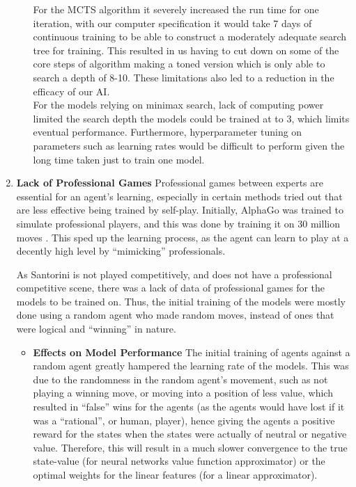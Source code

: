 \documentclass[a4paper,12pt,table]{article}
\begin{document}
\begin{enumerate}
\begin{itemize}
        For the MCTS algorithm it severely increased the run time for one iteration, with our computer specification it would take 7 days of continuous training to be able to construct a moderately adequate search tree for training. This resulted in us having to cut down on some of the core steps of algorithm making a toned version which is only able to search a depth of 8-10. These limitations also led to a reduction in the efficacy of our AI. \\

        For the models relying on minimax search, lack of computing power limited the search depth the models could be trained at to 3, which limits eventual performance. Furthermore, hyperparameter tuning on parameters such as learning rates would be difficult to perform given the long time taken just to train one model.

    \end{itemize}

    \item \textbf{Lack of Professional Games}
    \newline
    Professional games between experts are essential for an agent’s learning, especially in certain methods tried out that are less effective being trained by self-play. Initially, AlphaGo was trained to simulate professional players, and this was done by training it on 30 million moves \cite{Mastering the game of Go with deep neural networks and tree search}. This sped up the learning process, as the agent can learn to play at a decently high level by “mimicking” professionals.   \par

    As Santorini is not played competitively, and does not have a professional competitive scene, there was a lack of data of professional games for the models to be trained on. Thus, the initial training of the models were mostly done using a random agent who made random moves, instead of ones that were logical and “winning” in nature.
    
    \begin{itemize}
        \item \textbf{Effects on Model Performance}
        \newline
        The initial training of agents against a random agent greatly hampered the learning rate of the models. This was due to the randomness in the random agent’s movement, such as not playing a winning move, or moving into a position of less value, which resulted in “false” wins for the agents (as the agents would have lost if it was a “rational”, or human, player), hence giving the agents a positive reward for the states when the states were actually of neutral or negative value. Therefore, this will result in a much slower convergence to the true state-value (for neural networks value function approximator) or the optimal weights for the linear features (for a linear approximator). \\


\end{itemize}
\end{enumerate}
\end{document}
